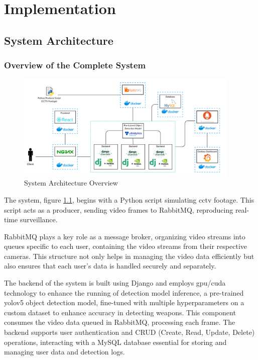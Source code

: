 \chapter{Implementation}
\label{chapter:implementation}

\newenvironment{implementation}
{\quote\itshape}
{\endquote}

\begin{implementation}
\end{implementation}

\section{System Architecture}
\subsection{Overview of the Complete System}
\begin{figure}[h]
    \centering 
    \includegraphics[width=0.95\textwidth]{figs/implementation-architecture2.png} 
    \caption{System Architecture Overview}
    \label{fig:implementation-arch}
\end{figure}
The system, figure \ref{fig:implementation-arch}, begins with a Python script simulating \ac{cctv} footage. This script acts as a producer, sending video frames
to RabbitMQ, reproducing real-time surveillance.

RabbitMQ plays a key role as a message broker, organizing video streams into queues specific to each user, 
containing the video streams from their respective cameras. 
This structure not only helps in managing the video data efficiently but also ensures that each user's data is 
handled securely and separately.

The backend of the system is built using Django and employs \ac{gpu}/\ac{cuda} technology to enhance the 
running of detection model inference, a pre-trained \ac{yolo}v5 object detection model, fine-tuned with multiple
hyperparameters on a custom dataset to enhance accuracy in detecting weapons.
This component consumes the video data queued in RabbitMQ, 
processing each frame. 
The backend supports user authentication and CRUD (Create, Read, Update, Delete) operations, 
interacting with a MySQL database essential for storing and managing user data and detection logs.

